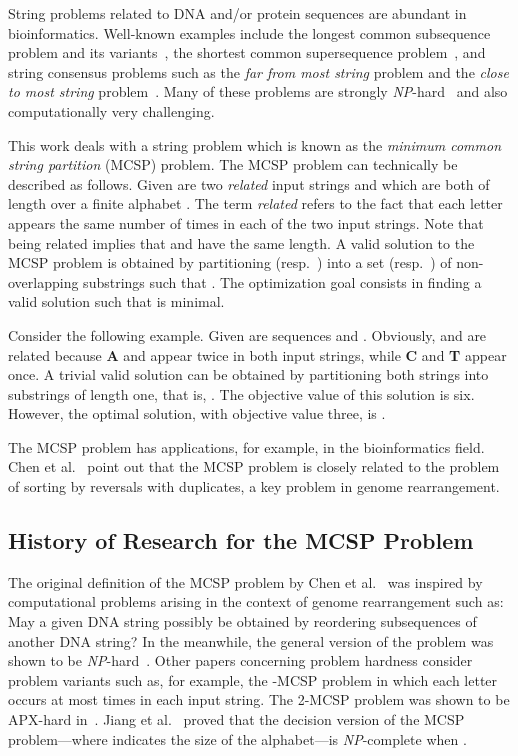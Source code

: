 \documentclass[11pt,a4paper]{article}
\begin{document}
String problems related to DNA and/or protein sequences are abundant in
bioinformatics. Well-known examples include the longest common
subsequence problem and its variants~\cite{HsuDu84lcs,SmiWat81:jmb}, the
shortest common supersequence problem~\cite{Gal2012:plosone}, and string
consensus problems such as the \emph{far from most string} problem and
the \emph{close to most string} problem~\cite{MouBabMon12a,MenOliPar05}.
Many of these problems are strongly \emph{NP}-hard~\cite{GJ79} and also computationally
very challenging.

This work deals with a string problem which is known as the \emph{minimum common string partition} (MCSP) problem. The MCSP problem can technically be described as follows. Given are two \emph{related} input strings  and  which are both of length  over a finite alphabet . The term \emph{related} refers to the fact that each letter appears the same number of times in each of the two input strings. Note that being related implies that  and  have the same length. A valid solution to the MCSP problem is obtained by partitioning  (resp.~) into a set  (resp.~) of non-overlapping substrings such that . The optimization goal consists in finding a valid solution such that  is minimal.

Consider the following example. Given are sequences  and . Obviously,  and  are
related because {\bf A} and  appear twice in both input
strings, while {\bf C} and {\bf T} appear once. A trivial valid solution
can be obtained by partitioning both strings into substrings of length
one, that is, . The objective 
value of this solution is six. However, the optimal solution, with
objective value three, is .

The MCSP problem has applications, for example, in the bioinformatics field. Chen et al.~\cite{CheEtAl05:journal} point out that the MCSP problem is closely related to the problem of sorting by reversals with duplicates, a key problem in genome rearrangement. 

\subsection{History of Research for the MCSP Problem}

The original definition of the MCSP problem by Chen et
al.~\cite{CheEtAl05:journal} was inspired by computational problems
arising in the context of genome rearrangement such as:
May a given DNA string possibly be obtained by reordering subsequences 
of another DNA string? 
In the meanwhile, the general version of the problem was shown to be
\emph{NP}-hard~\cite{Goldstein2004}. Other papers concerning problem
hardness consider problem variants such as, for example, the -MCSP
problem in which each letter occurs at most  times in each input
string. The 2-MCSP problem was shown to be APX-hard
in~\cite{Goldstein2004}. Jiang et al.~\cite{Jiang2010} proved that the
decision version of the MCSP problem---where  indicates the size
of the alphabet---is \emph{NP}-complete when .
\end{document}
